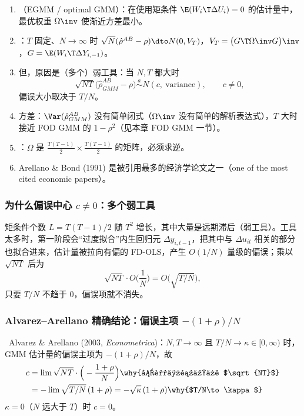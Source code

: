 \begin{thm}\label{thm:U12b-abprop}
\begin{enumerate}[label=(\alph*)]
  \item {}（EGMM / optimal GMM）：在使用矩条件 $\E(W_i\T\Delta U_i)=0$ 的估计量中，最优权重 $\Omega\inv$ 使渐近方差最小。
  \item {}：$T$ 固定、$N\to\infty$ 时 $\sqrt N(\hat\rho^{AB}-\rho)\dto N(0,V_T)$，$V_T=\big(G\T\Omega\inv G\big)\inv$，$G=\E(W_i\T\Delta Y_{i,-1})$。
  \item 但，原因是（多个）弱工具：当 $N,T$ 都大时
  \[
  \sqrt{NT}\big(\hat\rho^{AB}_{GMM}-\rho\big)\overset{a}{\sim}N(c,\ \text{variance}),\qquad c\neq0,
  \]
  偏误大小取决于 $T/N$。
  \item 方差：$\Var(\hat\rho^{AB}_{GMM})$ 没有简单闭式（$\Omega\inv$ 没有简单的解析表达式），$T$ 大时接近 FOD GMM 的 $1-\rho^2$（见本章 FOD GMM 一节）。
  \item {}：$\Omega$ 是 $\frac{T(T-1)}{2}\times\frac{T(T-1)}{2}$ 的矩阵，必须求逆。
  \item Arellano \& Bond (1991) 是被引用最多的经济学论文之一（one of the most cited economic papers）。
\end{enumerate}
\end{thm}

\subsubsection{为什么偏误中心 \texorpdfstring{$c\neq0$}{c != 0}：多个弱工具}

矩条件个数 $L=T(T-1)/2$ 随 $T^2$ 增长，其中大量是远期滞后（弱工具）。工具太多时，第一阶段会“过度拟合”内生回归元 $\Delta y_{i,t-1}$，把其中与 $\Delta u_{it}$ 相关的部分也拟合进来，估计量被拉向有偏的 FD-OLS，产生 $O(1/N)$ 量级的偏误；乘以 $\sqrt{NT}$ 后为
\[
\sqrt{NT}\cdot O\Big(\frac1N\Big)=O\Big(\sqrt{T/N}\Big),
\]
只要 $T/N$ 不趋于 $0$，偏误项就不消失。

\subsubsection{Alvarez--Arellano 精确结论：偏误主项 \texorpdfstring{$-(1+\rho)/N$}{-(1+rho)/N}}

\tagext\ Alvarez \& Arellano (2003, \emph{Econometrica})：$N,T\to\infty$ 且 $T/N\to\kappa\in[0,\infty)$ 时，GMM 估计量的偏误主项为 $-(1+\rho)/N$，故
\begin{align*}
c &= \lim\sqrt{NT}\cdot\Big(-\frac{1+\rho}{N}\Big) \why{偏误主项乘以 $\sqrt{NT}$}\\
&= -\lim\sqrt{T/N}\,(1+\rho)=-\sqrt\kappa\,(1+\rho) \why{$T/N\to\kappa$}
\end{align*}
$\kappa=0$（$N$ 远大于 $T$）时 $c=0$。

